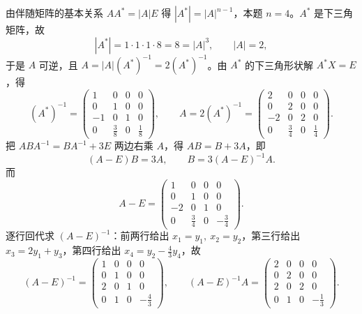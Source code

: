 
\begin{solution}
由伴随矩阵的基本关系 $AA^{*}=|A|E$ 得 $|A^{*}|=|A|^{n-1}$，本题 $n=4$。$A^{*}$ 是下三角矩阵，故
\[
|A^{*}|=1\cdot1\cdot1\cdot8=8=|A|^{3},\qquad |A|=2,
\]
于是 $A$ 可逆，且 $A=|A|(A^{*})^{-1}=2(A^{*})^{-1}$。由 $A^{*}$ 的下三角形状解 $A^{*}X=E$，得
\[
(A^{*})^{-1}=\begin{pmatrix}1&0&0&0\\0&1&0&0\\-1&0&1&0\\0&\frac38&0&\frac18\end{pmatrix},\qquad
A=2(A^{*})^{-1}=\begin{pmatrix}2&0&0&0\\0&2&0&0\\-2&0&2&0\\0&\frac34&0&\frac14\end{pmatrix}.
\]
把 $ABA^{-1}=BA^{-1}+3E$ 两边右乘 $A$，得 $AB=B+3A$，即
\[
(A-E)B=3A,\qquad B=3(A-E)^{-1}A .
\]
而
\[
A-E=\begin{pmatrix}1&0&0&0\\0&1&0&0\\-2&0&1&0\\0&\frac34&0&-\frac34\end{pmatrix}.
\]
逐行回代求 $(A-E)^{-1}$：前两行给出 $x_1=y_1,\ x_2=y_2$，第三行给出 $x_3=2y_1+y_3$，第四行给出 $x_4=y_2-\frac43y_4$，故
\[
(A-E)^{-1}=\begin{pmatrix}1&0&0&0\\0&1&0&0\\2&0&1&0\\0&1&0&-\frac43\end{pmatrix},\qquad
(A-E)^{-1}A=\begin{pmatrix}2&0&0&0\\0&2&0&0\\2&0&2&0\\0&1&0&-\frac13\end{pmatrix}.
\]
\end{solution}

